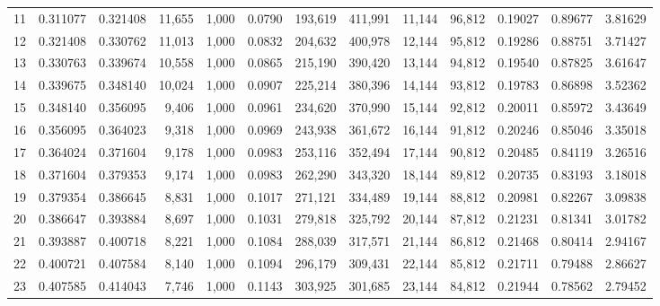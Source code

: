 \begin{tabular}{rrrrrrrrrrrrr}
11  &  0.311077 &  0.321408 &  11,655 &  1,000 &                                     0.0790 &  193,619 &  411,991 &   11,144 &   96,812 &  0.19027 &  0.89677 &  3.81629 \\
12  &  0.321408 &  0.330762 &  11,013 &  1,000 &                                     0.0832 &  204,632 &  400,978 &   12,144 &   95,812 &  0.19286 &  0.88751 &  3.71427 \\
13  &  0.330763 &  0.339674 &  10,558 &  1,000 &                                     0.0865 &  215,190 &  390,420 &   13,144 &   94,812 &  0.19540 &  0.87825 &  3.61647 \\
14  &  0.339675 &  0.348140 &  10,024 &  1,000 &                                     0.0907 &  225,214 &  380,396 &   14,144 &   93,812 &  0.19783 &  0.86898 &  3.52362 \\
15  &  0.348140 &  0.356095 &   9,406 &  1,000 &                                     0.0961 &  234,620 &  370,990 &   15,144 &   92,812 &  0.20011 &  0.85972 &  3.43649 \\
16  &  0.356095 &  0.364023 &   9,318 &  1,000 &                                     0.0969 &  243,938 &  361,672 &   16,144 &   91,812 &  0.20246 &  0.85046 &  3.35018 \\
17  &  0.364024 &  0.371604 &   9,178 &  1,000 &                                     0.0983 &  253,116 &  352,494 &   17,144 &   90,812 &  0.20485 &  0.84119 &  3.26516 \\
18  &  0.371604 &  0.379353 &   9,174 &  1,000 &                                     0.0983 &  262,290 &  343,320 &   18,144 &   89,812 &  0.20735 &  0.83193 &  3.18018 \\
19  &  0.379354 &  0.386645 &   8,831 &  1,000 &                                     0.1017 &  271,121 &  334,489 &   19,144 &   88,812 &  0.20981 &  0.82267 &  3.09838 \\
20  &  0.386647 &  0.393884 &   8,697 &  1,000 &                                     0.1031 &  279,818 &  325,792 &   20,144 &   87,812 &  0.21231 &  0.81341 &  3.01782 \\
21  &  0.393887 &  0.400718 &   8,221 &  1,000 &                                     0.1084 &  288,039 &  317,571 &   21,144 &   86,812 &  0.21468 &  0.80414 &  2.94167 \\
22  &  0.400721 &  0.407584 &   8,140 &  1,000 &                                     0.1094 &  296,179 &  309,431 &   22,144 &   85,812 &  0.21711 &  0.79488 &  2.86627 \\
23  &  0.407585 &  0.414043 &   7,746 &  1,000 &                                     0.1143 &  303,925 &  301,685 &   23,144 &   84,812 &  0.21944 &  0.78562 &  2.79452 \\

\end{tabular}
